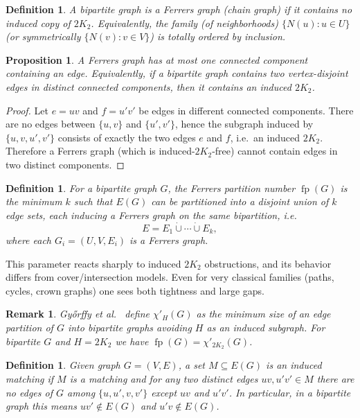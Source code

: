 \documentclass[12pt]{amsart}
\newtheorem{proposition}{Proposition}
\newtheorem{definition}[theorem]{Definition}
\newtheorem{remark}[theorem]{Remark}
\newcommand{\fp}{\operatorname{fp}}
\begin{document}
\begin{definition}
A bipartite graph is a \emph{Ferrers graph} (chain graph) if it contains no induced copy of $2K_2$.
Equivalently, the family (of neighborhoods) $\{N(u):u\in U\}$ (or symmetrically $\{N(v):v\in V\}$) is totally ordered by inclusion.
\end{definition}

\begin{proposition}\label{prop:one-component}
A Ferrers graph has at most one connected component containing an edge.
Equivalently, if a bipartite graph contains two vertex-disjoint edges in distinct connected components,
then it contains an induced $2K_2$.
\end{proposition}

\begin{proof}
Let $e=uv$ and $f=u'v'$ be edges in different connected components.
There are no edges between $\{u,v\}$ and $\{u',v'\}$, hence the subgraph induced by
$\{u,v,u',v'\}$ consists of exactly the two edges $e$ and $f$, i.e.\ an induced $2K_2$.
Therefore a Ferrers graph (which is induced-$2K_2$-free) cannot contain edges in two distinct components.
\end{proof}

\begin{definition}
For a bipartite graph $G$, the \emph{Ferrers partition number} $\fp(G)$ is the minimum $k$ such that
$E(G)$ can be partitioned into a disjoint union of $k$ edge sets, each inducing a Ferrers graph on the same bipartition, i.e.
\[
E = E_1 \dot\cup \cdots \dot\cup E_k,
\]
where each $G_i=(U,V,E_i)$ is a Ferrers graph.
\end{definition}

This parameter reacts sharply to induced $2K_2$ obstructions, and its behavior differs from cover/intersection models.
Even for very classical families (paths, cycles, crown graphs) one sees both tightness and large gaps.

\begin{remark}
Gy\H{o}rffy et al.~\cite{GyorffyLondonNagyPluhar2025} define $\chi'_H(G)$ as the minimum size of an edge partition of $G$ into bipartite graphs avoiding $H$ as an induced subgraph.
For bipartite $G$ and $H=2K_2$ we have $\fp(G)=\chi'_{2K_2}(G)$.
\end{remark}

\begin{definition}
Given graph $G=(V,E)$, a set $M\subseteq E(G)$ is an \emph{induced matching} if $M$ is a matching and for any two distinct edges $uv, u'v'\in M$ there are no edges of $G$ among
$\{u,u',v,v'\}$ except $uv$ and $u'v'$. In particular, in a bipartite graph this means
$uv'\notin E(G)$ and $u'v\notin E(G)$.
\end{definition}
\end{document}
